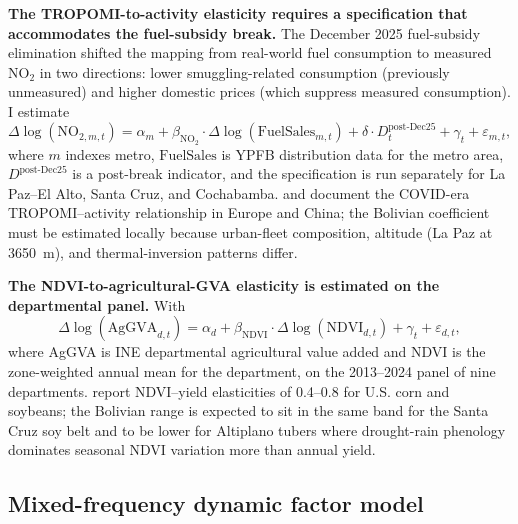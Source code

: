 \documentclass[11pt,letterpaper]{article}
\newcommand{\claim}[1]{\textbf{#1.}}
\begin{document}
\claim{The TROPOMI-to-activity elasticity requires a specification that accommodates the fuel-subsidy break} The December \num{2025} fuel-subsidy elimination shifted the mapping from real-world fuel consumption to measured NO$_2$ in two directions: lower smuggling-related consumption (previously unmeasured) and higher domestic prices (which suppress measured consumption). I estimate
\begin{equation}
\Delta \log(\text{NO}_{2,m,t}) = \alpha_m + \beta_{\text{NO}_2} \cdot \Delta \log(\text{FuelSales}_{m,t}) + \delta \cdot D^{\text{post-Dec25}}_t + \gamma_t + \varepsilon_{m,t},
\label{eq:no2_elasticity}
\end{equation}
where $m$ indexes metro, $\text{FuelSales}$ is YPFB distribution data for the metro area, $D^{\text{post-Dec25}}$ is a post-break indicator, and the specification is run separately for La Paz--El Alto, Santa Cruz, and Cochabamba. \citet{bauwens2020} and \citet{liu_china2020} document the COVID-era TROPOMI--activity relationship in Europe and China; the Bolivian coefficient must be estimated locally because urban-fleet composition, altitude (La Paz at \num{3650}~m), and thermal-inversion patterns differ.

\claim{The NDVI-to-agricultural-GVA elasticity is estimated on the departmental panel} With
\begin{equation}
\Delta \log(\text{AgGVA}_{d,t}) = \alpha_d + \beta_{\text{NDVI}} \cdot \Delta \log(\text{NDVI}_{d,t}) + \gamma_t + \varepsilon_{d,t},
\label{eq:ndvi_elasticity}
\end{equation}
where AgGVA is INE departmental agricultural value added and NDVI is the zone-weighted annual mean for the department, on the \numrange{2013}{2024} panel of nine departments. \citet{johnson_etal2014} report NDVI--yield elasticities of \numrange{0.4}{0.8} for U.S. corn and soybeans; the Bolivian range is expected to sit in the same band for the Santa Cruz soy belt and to be lower for Altiplano tubers where drought-rain phenology dominates seasonal NDVI variation more than annual yield.

\subsection{Mixed-frequency dynamic factor model}
\end{document}
